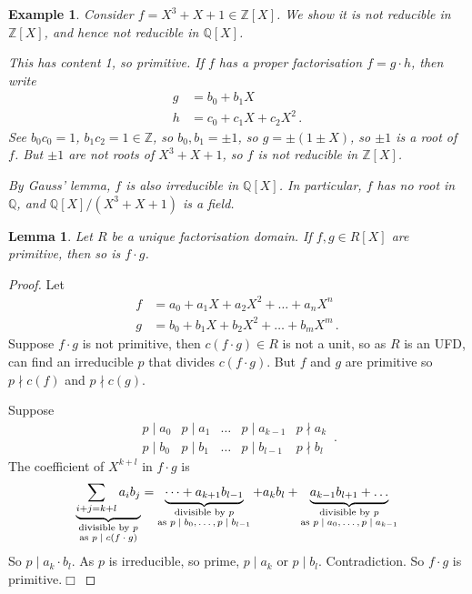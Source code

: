 \documentclass{article}
\theoremstyle{plain}\theoremheaderfont{\normalfont\itshape}\theorembodyfont{\rmfamily}\theoremseparator{.}\newtheorem*{rem}{Remark}\newtheorem*{ex}{Example}\newtheorem*{proof}{Proof}\newtheorem*{altp}{Alternative proof}\newtheorem*{nonex}{Non-Example}
\theoremstyle{plain}\theoremheaderfont{\normalfont\bfseries}\theorembodyfont{\rmfamily}\theoremseparator{.}\newtheorem{thm}{Theorem}[section]\newtheorem{lem}[thm]{Lemma}\newtheorem{prop}[thm]{Proposition}\newtheorem*{cor}{Corollary}\newtheorem{defn}[thm]{Definition}\newtheorem{clm}[thm]{Claim}\newtheorem{clminproof}{Claim}\newtheorem*{notn}{Notation}\newtheorem*{exer}{Exercise}\newtheorem*{lemnn}{Lemma}
\theoremstyle{break}\theoremheaderfont{\normalfont\itshape}\theorembodyfont{\rmfamily}\theoremseparator{.\medskip}\newtheorem*{proofskip}{Proof}\newtheorem*{exs}{Examples}\newtheorem*{rems}{Remarks}\newtheorem*{obs}{Observations}
\theoremstyle{break}\theoremheaderfont{\normalfont\bfseries}\theorembodyfont{\rmfamily}\theoremseparator{.\medskip}\newtheorem{lemskip}[thm]{Lemma}\newtheorem{defnskip}[thm]{Definition}\newtheorem{propskip}[thm]{Proposition}\newtheorem{thmskip}[thm]{Theorem}
\numberwithin{equation}{section}
\newcommand{\qed}{\hfill\ensuremath{\Box}}
\newcommand{\ZZ}{\mathbb{Z}}
\newcommand{\QQ}{\mathbb{Q}}
\begin{document}
    \begin{ex}
        Consider \(f=X^3+X+1\in\ZZ[X]\). We show it is not reducible in \(\ZZ[X]\), and hence not reducible in \(\QQ[X]\).

        This has content 1, so primitive. If \(f\) has a proper factorisation \(f=g\cdot h\), then write
        \begin{align*}
            g&=b_0+b_1X\\
            h&=c_0+c_1X+c_2X^2\,.
        \end{align*}
        See \(b_0c_0=1\), \(b_1c_2=1\in\ZZ\), so \(b_0,b_1=\pm 1\), so \(g=\pm(1\pm X)\), so \(\pm 1\) is a root of \(f\). But \(\pm 1\) are not roots of \(X^3+X+1\), so \(f\) is not reducible in \(\ZZ[X]\).

        By Gauss' lemma, \(f\) is also irreducible in \(\QQ[X]\). In particular, \(f\) has no root in \(\QQ\), and \(\QQ[X]/(X^3+X+1)\) is a field.
    \end{ex}
    \begin{lem}
        Let \(R\) be a unique factorisation domain. If \(f,g\in R[X]\) are primitive, then so is \(f\cdot g\).
    \end{lem}
    \begin{proof}
        Let
        \begin{align*}
            f&=a_0+a_1X+a_2X^2+\dots +a_nX^n\\
            g&=b_0+b_1X+b_2X^2+\dots +b_mX^m\,.
        \end{align*}
        Suppose \(f\cdot g\) is not primitive, then \(c(f\cdot g)\in R\) is not a unit, so as \(R\) is an UFD, can find an irreducible \(p\) that divides \(c(f\cdot g)\). But \(f\) and \(g\) are primitive so \(p\nmid c(f)\) and \(p\nmid c(g)\).

        Suppose
        \[\begin{matrix}
            p\mid a_0 & p\mid a_1 & \dots & p\mid a_{k-1} & p\nmid a_k \\
            p\mid b_0 & p\mid b_1 & \dots & p\mid b_{l-1} & p\nmid b_{l} 
        \end{matrix}\,.\]
        The coefficient of \(X^{k+l}\) in \(f\cdot g\) is
        \[\underbrace{\sum_{i+j=k+l}a_ib_j}_{\begin{subarray}{c}\text{divisible by \(p\)} \\ \text{as \(p\mid c(f\cdot g)\)}\end{subarray}}=\underbrace{\dots+a_{k+1}b_{l-1}}_{\begin{subarray}{c}\text{divisible by \(p\)} \\ \text{as \(p\mid b_0,\dots, p\mid b_{l-1}\)}\end{subarray}}+a_kb_l+\underbrace{a_{k-1}b_{l+1}+\dots}_{\begin{subarray}{c}\text{divisible by \(p\)} \\ \text{as \(p\mid a_0,\dots, p\mid a_{k-1}\)}\end{subarray}}\]
        So \(p\mid a_k\cdot b_l\). As \(p\) is irreducible, so prime, \(p\mid a_k\) or \(p\mid b_l\). Contradiction. So \(f\cdot g\) is primitive.\qed
    \end{proof}
\end{document}
